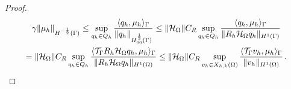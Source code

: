 \documentclass[r]{siamart171218}
\begin{document}
\begin{proof}
\begin{multline*}
\gamma \|\mu_h\|_{H^{-\frac 12}(\Gamma)} 
\leq 
\sup_{q_h \in Q_h} \frac{ \langle q_h, \mu_h \rangle_{\Gamma} } {\|q_h\|_{H^{\frac 12}_{00}(\Gamma)}} 
\leq
\|\mathcal{H}_{\Omega}\| C_R \sup_{q_h \in Q_h} \frac{ \langle q_h, \mu_h \rangle_{\Gamma} } {\|R_h \mathcal{H}_{\Omega} q_h\|_{H^1(\Gamma)}}
\\
=
\|\mathcal{H}_{\Omega}\| C_R \sup_{q_h \in Q_h} \frac{ \langle {\mathcal{T}_\Gamma} R_h  \mathcal{H}_{\Omega}q_h, \mu_h \rangle_{\Gamma} } {\|R_h \mathcal{H}_{\Omega} q_h\|_{H^1(\Omega)}} 
\leq \|\mathcal{H}_{\Omega}\| C_R \sup_{v_h \in X_{h,k}(\Omega)} \frac{ \langle {\mathcal{T}_\Gamma} v_h, \mu_h \rangle_{\Gamma} } {\|v_h\|_{H^1(\Omega)}}\,. 
\end{multline*}
\end{proof}

\end{document}
